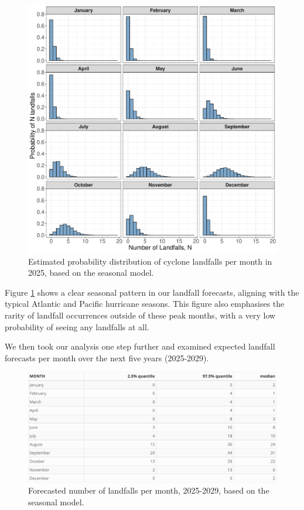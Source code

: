 \documentclass[
]{article}
\begin{document}
\begin{figure}

{\centering \includegraphics[width=0.82\linewidth]{../outputs/bayesian-analysis-landfall-freq/landfall-monthly-density-plots} 

}

\caption{Estimated probability distribution of cyclone landfalls per month in 2025, based on the seasonal model.}\label{fig:figs2}
\end{figure}

Figure \ref{fig:figs2} shows a clear seasonal pattern in our landfall forecasts, aligning with the typical Atlantic and Pacific hurricane seasons. This figure also emphasises the rarity of landfall occurrences outside of these peak months, with a very low probability of seeing any landfalls at all.

We then took our analysis one step further and examined expected landfall forecasts per month over the next five years (2025-2029).

\begin{figure}

{\centering \includegraphics[width=1\linewidth]{../outputs/bayesian-analysis-landfall-freq/simple-landfalls-monthly-forecasts} 

}

\caption{Forecasted number of landfalls per month, 2025-2029, based on the seasonal model.}\label{fig:figs3}
\end{figure}
\end{document}
